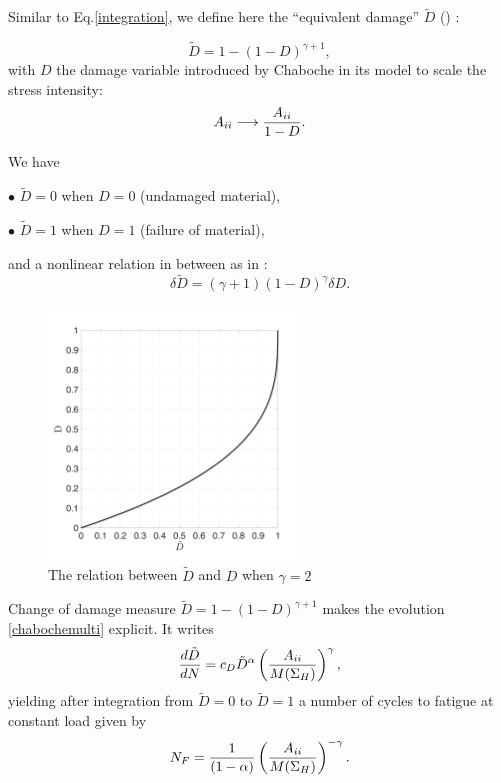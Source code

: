 Similar to Eq.\eqref{integration}, we define here the ``equivalent damage'' $\tilde{D}$ () :

\begin{equation}
\tilde{D}=1-(1-D)^{\gamma+1},
\label{eq.Dhat}
\end{equation}
with $D$ the damage variable introduced by Chaboche in its model to scale the stress intensity:
$${A}_{\uppercase\expandafter{\romannumeral2}} \longrightarrow \dfrac{{A}_{\uppercase\expandafter{\romannumeral2}}}{1-D}.$$

We have 

$\bullet$ $\tilde{D}=0$ when $D=0$ (undamaged material),

$\bullet$ $\tilde{D}=1$ when $D=1$ (failure of material),	

and a nonlinear relation in between as in :
$$\delta\tilde{D}=\left(\gamma+1 \right)\left( 1-D\right)^\gamma \delta D.$$	
\begin{figure}
\centering
\includegraphics[width=0.6\textwidth]{figures//Dhat.png} 
\caption{The relation between $\tilde{D}$ and $D$ when $\gamma=2$}
\label{fig.Dhat}
\end{figure}

Change of damage measure $\tilde{D} = 1 - (1-D)^{\gamma+1}$ makes the evolution \eqref{chabochemulti} explicit. It writes
\begin{equation}
\dfrac{d\tilde{D}}{dN} = c_D {\tilde{D}}^\alpha \left(\dfrac{{A}_{\uppercase\expandafter{\romannumeral2}}}{M(\Sigma_{H})} \right) ^\gamma,
\label{eq.diffchaboche}
\end{equation}
yielding after integration from $\tilde{D}=0$ to $\tilde{D}=1$  a number of cycles to fatigue at constant load given by
$$
N_F =\dfrac{1}{(1-\alpha)}\left(\dfrac{{A}_{\uppercase\expandafter{\romannumeral2}}}{M(\Sigma_{H})} \right) ^{-\gamma}.
$$

